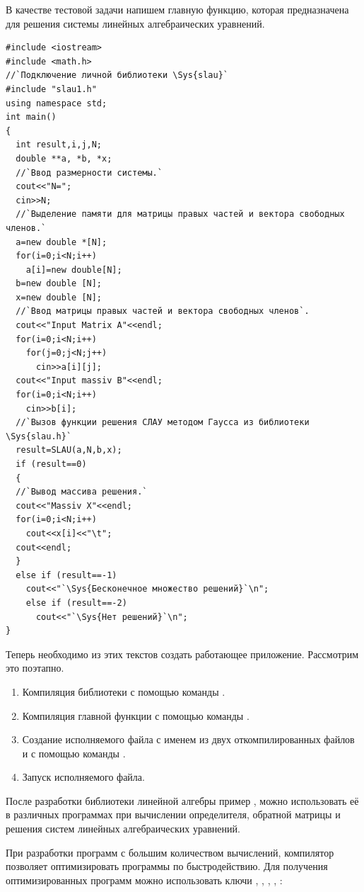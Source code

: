 В качестве тестовой задачи напишем главную функцию, которая предназначена для решения системы линейных алгебраических
уравнений.
\begin{lstlisting}
#include <iostream>
#include <math.h>
//`Подключение личной библиотеки \Sys{slau}`
#include "slau1.h"
using namespace std;
int main()
{
  int result,i,j,N;
  double **a, *b, *x; 
  //`Ввод размерности системы.`
  cout<<"N=";
  cin>>N;
  //`Выделение памяти для матрицы правых частей и вектора свободных членов.`
  a=new double *[N];
  for(i=0;i<N;i++)
    a[i]=new double[N];
  b=new double [N];
  x=new double [N];
  //`Ввод матрицы правых частей и вектора свободных членов`.
  cout<<"Input Matrix A"<<endl;
  for(i=0;i<N;i++)
    for(j=0;j<N;j++)
      cin>>a[i][j];
  cout<<"Input massiv B"<<endl;
  for(i=0;i<N;i++)
    cin>>b[i];
  //`Вызов функции решения СЛАУ методом Гаусса из библиотеки \Sys{slau.h}`
  result=SLAU(a,N,b,x);
  if (result==0)
  {
  //`Вывод массива решения.`
  cout<<"Massiv X"<<endl;
  for(i=0;i<N;i++)
    cout<<x[i]<<"\t";
  cout<<endl;
  }
  else if (result==-1)
    cout<<"`\Sys{Бесконечное множество решений}`\n";
    else if (result==-2)
      cout<<"`\Sys{Нет решений}`\n";
}
\end{lstlisting}

Теперь необходимо из этих текстов создать работающее приложение. Рассмотрим это поэтапно.

\begin{enumerate}
\item Компиляция библиотеки  с помощью команды .
\item Компиляция главной функции  с помощью команды .
\item Создание исполняемого файла с именем  из двух откомпилированных файлов  и
 с помощью команды .
\item Запуск исполняемого файла.
\end{enumerate}
После разработки библиотеки линейной алгебры пример , можно использовать её в различных программах при
вычислении определителя, обратной матрицы и решения систем линейных алгебраических уравнений.

При разработки программ с большим количеством вычислений, компилятор  позволяет оптимизировать программы по
быстродействию. Для получения оптимизированных программ можно использовать ключи , ,
, , :

